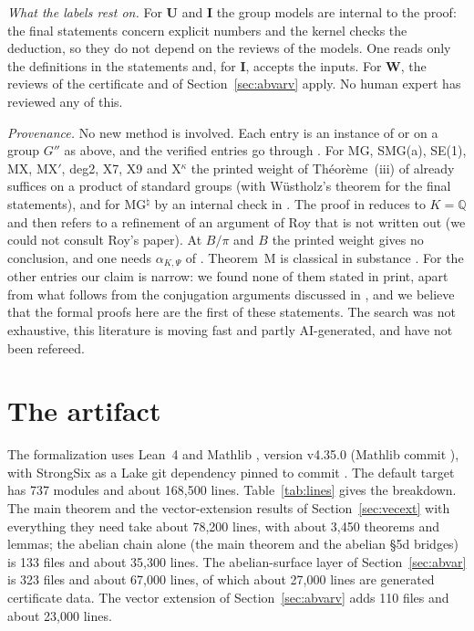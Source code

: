 \documentclass[11pt]{amsart}
\theoremstyle{definition}
\theoremstyle{remark}
\numberwithin{equation}{section}
\newcommand{\QQ}{\mathbb{Q}}
\begin{document}
\emph{What the labels rest on.} For \textbf{U} and \textbf{I} the group models are internal to the proof: the final statements
concern explicit numbers and the kernel checks the deduction, so they do not depend on the reviews of the models. One reads only
the definitions in the statements and, for \textbf{I}, accepts the inputs. For \textbf{W}, the reviews of the certificate and of Section~\ref{sec:abvarv} apply. No human expert has reviewed any of this.

\emph{Provenance.} No new method is involved. Each entry is an instance of \cite[Thm.~4.1]{W88} or \cite[\S5d]{W88} on a group
$G''$ as above, and the verified entries go through \cite[\S5d]{W88}. For MG, SMG(a), SE(1), MX, MX$'$, deg2, X7, X9 and X$^\kappa$ the printed weight of Th\'eor\`eme~(iii) of
\cite{RoyWaldschmidt1993} already suffices on a product of standard groups (with W\"ustholz's theorem for the final statements),
and for MG$^\natural$ by an internal check in \cite{Note}. The proof in \cite{RoyWaldschmidt1993} reduces to $K=\QQ$ and
then refers to a refinement of an argument of Roy that is not written out (we could not consult Roy's paper). At $B/\pi$ and $B$
the printed weight gives no conclusion, and one needs $\alpha_{K,\Psi}$ of \cite{RPaper}. Theorem~M is classical in substance
\cite{Note}. For the other entries our claim is narrow: we found none of them stated in print, apart from what follows from
the conjugation arguments discussed in \cite{Note}, and we believe that the formal proofs here are the first of these
statements. The search was not exhaustive, this literature is moving fast and partly AI-generated, and \cite{Note,RPaper} have not been refereed.

\section{The artifact}\label{sec:stats}

The formalization \cite{LSGRepo} uses Lean~4 \cite{Lean4} and Mathlib \cite{Mathlib}, version v4.35.0 (Mathlib commit
), with StrongSix \cite{StrongSixRepo} as a Lake git dependency pinned to commit . The default target
 has 737 modules and about 168{,}500 lines. Table~\ref{tab:lines} gives the breakdown. The main theorem and the
vector-extension results of Section~\ref{sec:vecext} with everything they need take about 78{,}200 lines, with about
3{,}450 theorems and lemmas; the abelian chain alone (the main theorem and the abelian \S5d bridges) is 133 files and
about 35{,}300 lines. The abelian-surface layer of Section~\ref{sec:abvar} is 323 files and about 67{,}000 lines, of
which about 27{,}000 lines are generated certificate data. The vector extension of Section~\ref{sec:abvarv} adds 110
files and about 23{,}000 lines.
\end{document}
